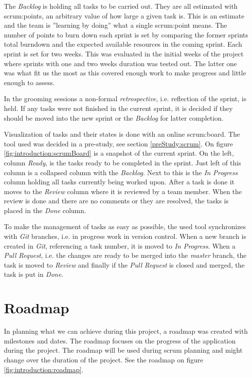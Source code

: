 The \textit{Backlog} is holding all tasks to be carried out.
They are all estimated with \glspl{scrum:point}, an arbitrary value of how large a given task is.
This is an estimate and the team is ''learning by doing'' what a single \gls{scrum:point} means.
The number of points to burn down each sprint is set by comparing the former sprints total burndown and the expected available resources in the coming sprint.
Each sprint is set for two weeks. 
This was evaluated in the initial weeks of the project where sprints with one and two weeks duration was tested out.
The latter one was what fit us the most as this covered enough work to make progress and little enough to assess.

In the grooming sessions a non-formal \textit{retrospective}, i.e. reflection of the sprint, is held. 
If any tasks were not finished in the current sprint, it is decided if they should be moved into the new sprint or the \textit{Backlog} for latter completion.

Visualization of tasks and their states is done with an online \gls{scrum:board}.
The tool used was decided in a pre-study, see section \ref{preStudy:scrum}.
On figure \ref{fig:introduction:scrumBoard} is a snapshot of the current sprint.
On the left, column \textit{Ready}, is the tasks ready to be completed in the sprint.
Just left of this column is a collapsed column with the \textit{Backlog}.
Next to this is the \textit{In Progress} column holding all tasks currently being worked upon.
After a task is done it moves to the \textit{Review} column where it is reviewed by a team member.
When the review is done and there are no comments or they are resolved, the tasks is placed in the \textit{Done} column.

To make the management of tasks as easy as possible, the used tool synchronizes with \textit{Git} branches, i.e. in progress work in version control. 
When a new branch is created in \textit{Git}, referencing a task number, it is moved to \textit{In Progress}. 
When a \textit{Pull Request}, i.e. the changes are ready to be merged into the \textit{master} branch, the task is moved to \textit{Review} and finally if the \textit{Pull Request} is closed and merged, the task is put in \textit{Done}.


\section{Roadmap}
In planning what we can achieve during this project, a roadmap was created with milestones and dates. 
The roadmap focuses on the progress of the application during the project. 
The roadmap will be used during \gls{scrum} planning and might change over the duration of the project. 
See the roadmap on figure \ref{fig:introduction:roadmap}.

